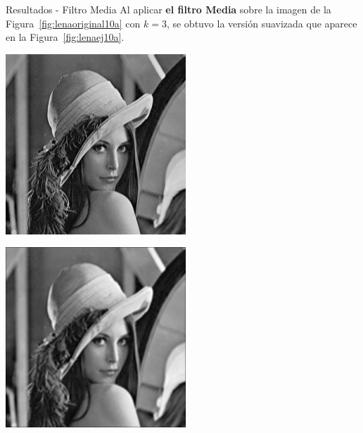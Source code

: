 \documentclass{beamer}
\begin{document}
\begin{frame}[fragile]{Resultados - Filtro Media}
	\justifying
	Al aplicar \textcolor{unahurverde}{\textbf{el filtro Media}} sobre la imagen de la Figura~\ref{fig:lenaoriginal10a} con $k=3$,  
	se obtuvo la versión suavizada que aparece en la Figura~\ref{fig:lenaej10a}.
	
	\vspace{0.5cm}
	\centering
	\begin{minipage}{0.45\linewidth}
		\centering
		\includegraphics[width=\linewidth]{../results/lena_original}
		\label{fig:lenaoriginal10a}
	\end{minipage}\hfill
	\begin{minipage}{0.45\linewidth}
		\centering
		\includegraphics[width=\linewidth]{../results/lena_ej10a}

\end{minipage}
\end{frame}
\end{document}
